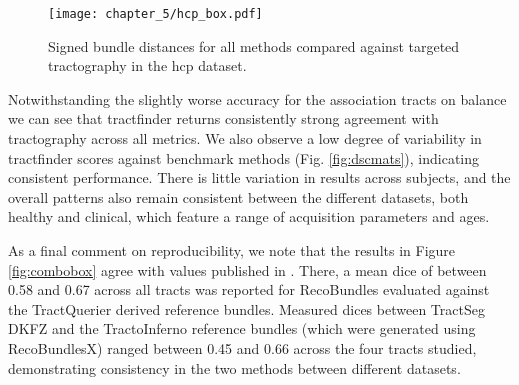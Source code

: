 \begin{SCfigure}
  \texttt{[image: chapter\_5/hcp\_box.pdf]}
  \caption[Signed bundle distances to streamline tractography, HCP dataset]{Signed bundle distances for all methods compared against targeted tractography in the \gls{hcp} dataset. }
  \label{fig:hcpbox}
\end{SCfigure}

Notwithstanding the slightly worse accuracy for the association tracts on balance we can see that tractfinder returns consistently strong agreement with tractography across all metrics.
We also observe a low degree of variability in tractfinder scores against benchmark methods (Fig. \ref{fig:dscmats}), indicating consistent performance.
There is little variation in results across subjects, and the overall patterns also remain consistent between the different datasets, both healthy and clinical, which feature a range of acquisition parameters and ages.

As a final comment on reproducibility, we note that the results in Figure \ref{fig:combobox} agree with values published in \textcite{Wasserthal2018}.
There, a mean \gls{dice} of between 0.58 and 0.67 across all tracts was reported for RecoBundles evaluated against the TractQuerier derived reference bundles.
Measured \glspl{dice} between TractSeg DKFZ and the TractoInferno reference bundles (which were generated using RecoBundlesX) ranged between 0.45 and 0.66 across the four tracts studied, demonstrating consistency in the two methods between different datasets.

